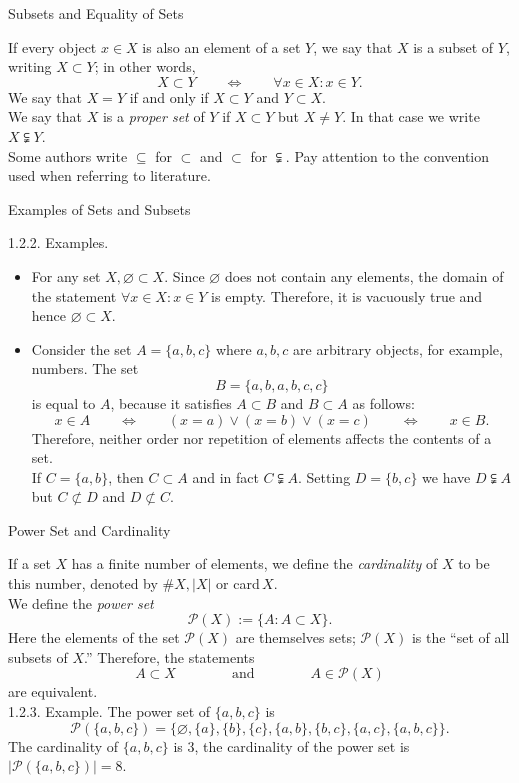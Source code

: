 \documentclass[smaller,hyperref={CJKbookmarks=true}]{beamer}
\begin{document}
\begin{frame}[c]{Subsets and Equality of Sets}
\begin{spacing}{1.1}
If every object $x\in X$ is also an element of a set $Y$, we say that $X$ is a subset of $Y$, writing $X\subset Y$; in other words,
\[X\subset Y\qquad\Leftrightarrow\qquad
\forall x\in X\!:x\in Y.\]
We say that $X=Y$ if and only if $X\subset Y$ and $Y\subset X$.\\[4pt]
We say that $X$ is a \emph{proper set} of $Y$ if $X\subset Y$ but $X\neq Y$. In that case we write $X\subsetneqq Y$.\\[4pt]
Some authors write $\subseteq$ for $\subset$ and $\subset$ for $\subsetneqq$. Pay attention to the convention used when referring to literature.
\end{spacing}
\end{frame}
\begin{frame}[t]{Examples of Sets and Subsets}
\begin{spacing}{1.05}
\alert{1.2.2. Examples.}
\begin{itemize}
  \item[1.] For any set $X,\varnothing\subset X$. Since $\varnothing$ does not contain any elements, the domain of the statement $\forall x\in X\!:x\in Y$ is empty. Therefore, it is vacuously true and hence $\varnothing\subset X$.
  \item[2.] Consider the set $A=\{a,b,c\}$ where $a,b,c$ are arbitrary objects, for example, numbers. The set
      \[B=\{a,b,a,b,c,c\}\]
      is equal to $A$, because it satisfies $A\subset B$ and $B\subset A$ as follows:
      \[x\in A\qquad\Leftrightarrow\qquad(x=a)\vee
      (x=b)\vee(x=c)\qquad\Leftrightarrow\qquad
      x\in B.\]
      Therefore, neither order nor repetition of elements af{}fects the contents of a set.\\[4pt]
      If $C=\{a,b\}$, then $C\subset A$ and in fact $C\subsetneqq A$. Setting $D=\{b,c\}$ we have $D\subsetneqq A$ but $C\not\subset D$ and $D\not\subset C$.
\end{itemize}
\end{spacing}
\end{frame}
\begin{frame}[t]{Power Set and Cardinality}
\begin{spacing}{1.05}
\vspace*{-5pt}
If a set $X$ has a finite number of elements, we define the \emph{cardinality} of $X$ to be this number, denoted by $\#X,|X|$ or card\,$X$.\\[5pt]
We define the \emph{power set}
\[\mathcal{P}(X):=\{A:A\subset X\}.\]
Here the elements of the set $\mathcal{P}(X)$ are themselves sets; $\mathcal{P}(X)$ is the ``set of all subsets of $X$.'' Therefore, the statements
\[A\subset X\qquad\qquad\text{and}
\qquad\qquad A\in\mathcal{P}(X)\]
are equivalent.\\[4pt]
\alert{1.2.3. Example.} The power set of $\{a,b,c\}$ is
\[\mathcal{P}(\{a,b,c\})=\big\{\varnothing,\{a\},
\{b\},\{c\},\{a,b\},\{b,c\},\{a,c\},\{a,b,c\}\big\}.\]
The cardinality of $\{a,b,c\}$ is 3, the cardinality of the power set is $|\mathcal{P}(\{a,b,c\})|=8$.
\end{spacing}
\end{frame}
\end{document}
